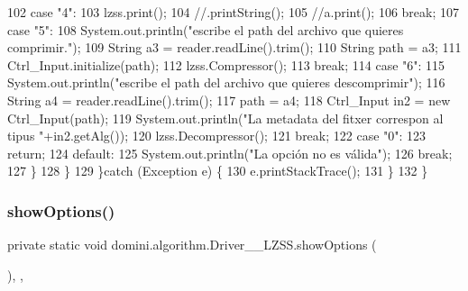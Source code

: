 \begin{DoxyCode}
102                 \textcolor{keywordflow}{case} \textcolor{stringliteral}{"4"}:
103                     lzss.print();
104                     \textcolor{comment}{//.printString();}
105                     \textcolor{comment}{//a.print();}
106                 \textcolor{keywordflow}{break};
107                 \textcolor{keywordflow}{case} \textcolor{stringliteral}{"5"}:
108                     System.out.println(\textcolor{stringliteral}{"escribe el path del archivo que quieres comprimir."});
109                     String a3 = reader.readLine().trim();
110                     String path = a3;
111                     Ctrl\_Input.initialize(path);
112                     lzss.Compressor();
113                 \textcolor{keywordflow}{break};
114                 \textcolor{keywordflow}{case} \textcolor{stringliteral}{"6"}:
115                     System.out.println(\textcolor{stringliteral}{"escribe el path del archivo que quieres descomprimir"});
116                     String a4 = reader.readLine().trim();
117                     path = a4;
118                     Ctrl\_Input in2 = \textcolor{keyword}{new} Ctrl\_Input(path);
119                     System.out.println(\textcolor{stringliteral}{"La metadata del fitxer correspon al tipus "}+in2.getAlg());
120                     lzss.Decompressor();
121                 \textcolor{keywordflow}{break};
122                 \textcolor{keywordflow}{case} \textcolor{stringliteral}{"0"}:
123                     \textcolor{keywordflow}{return};
124                 \textcolor{keywordflow}{default}:
125                     System.out.println(\textcolor{stringliteral}{"La opción no es válida"});
126                 \textcolor{keywordflow}{break};
127             \}
128         \}
129     \}\textcolor{keywordflow}{catch} (Exception e) \{
130         e.printStackTrace();
131     \}
132     \}
\end{DoxyCode}
\mbox{\label{classdomini_1_1algorithm_1_1Driver____LZSS_a4362a21690fbdb3ef42dd6f8ca0f0da6}} 
\subsubsection{\texorpdfstring{show\+Options()}{showOptions()}}
{\footnotesize\ttfamily private static void domini.\+algorithm.\+Driver\+\_\+\+\_\+\+L\+Z\+S\+S.\+show\+Options (\begin{DoxyParamCaption}{ }\end{DoxyParamCaption})\hspace{0.3cm}{\ttfamily [inline]}, {\ttfamily [static]}, {\ttfamily [private]}}



